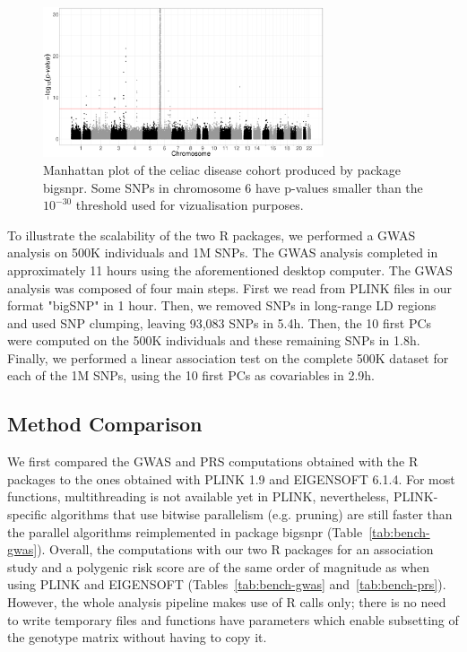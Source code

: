 \documentclass{bioinfo}
\begin{document}
\begin{figure}[!tpb]
\centerline{\includegraphics[width=235pt]{celiac-gwas-cut}}
\caption{Manhattan plot of the celiac disease cohort produced by package bigsnpr. Some SNPs in chromosome 6 have p-values smaller than the $10^{-30}$ threshold used for vizualisation purposes.}\label{fig:gwas}
\end{figure}

To illustrate the scalability of the two R packages, we performed a GWAS analysis on 500K individuals and 1M SNPs. The GWAS analysis completed in approximately 11 hours using the aforementioned desktop computer. The GWAS analysis was composed of four main steps. 
First we read from PLINK files in our format "bigSNP" in 1 hour.
Then, we removed SNPs in long-range LD regions and used SNP clumping, leaving 93,083 SNPs in 5.4h. Then, the 10 first PCs were computed on the 500K individuals and these remaining SNPs in 1.8h. Finally, we performed a linear association test on the complete 500K dataset for each of the 1M SNPs, using the 10 first PCs as covariables in 2.9h.

\subsection{Method Comparison}

We first compared the GWAS and PRS computations obtained with the R packages to the ones obtained with PLINK 1.9 and EIGENSOFT 6.1.4.
For most functions, multithreading is not available yet in PLINK, nevertheless, PLINK-specific algorithms that use bitwise parallelism (e.g. pruning) are still faster than the parallel algorithms reimplemented in package bigsnpr (Table~\ref{tab:bench-gwas}). Overall, the computations with our two R packages for an association study and a polygenic risk score are of the same order of magnitude as when using PLINK and EIGENSOFT (Tables~\ref{tab:bench-gwas} and~\ref{tab:bench-prs}). However, the whole analysis pipeline makes use of R calls only; there is no need to write temporary files and functions have parameters which enable subsetting of the genotype matrix without having to copy it. 
\end{document}
